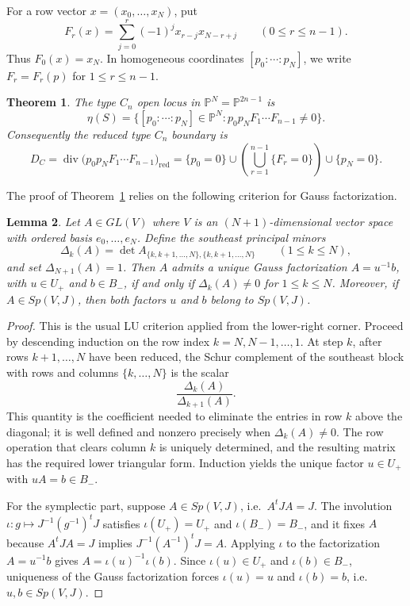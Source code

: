 \documentclass{article}
\newtheorem{thm}{Theorem}[section]
\newtheorem{lemma}[thm]{Lemma}
\newcommand{\PP}{\mathbb{P}}
\begin{document}
For a row vector \(x=(x_0,\ldots,x_N)\), put
\[
F_r(x)=\sum_{j=0}^r(-1)^jx_{r-j}x_{N-r+j}
\qquad(0\le r\le n-1).
\]
Thus \(F_0(x)=x_N\). In homogeneous coordinates \([p_0:\cdots:p_N]\), we write \(F_r=F_r(p)\) for \(1\le r\le n-1\).

\begin{thm}\label{thm:richardson-boundary}
The type \(C_n\) open locus in \(\PP^N=\PP^{2n-1}\) is
\[
\eta(S)=
\{[p_0:\cdots:p_N]\in \PP^N:
 p_0p_NF_1\cdots F_{n-1}\ne0\}.
\]
Consequently the reduced type \(C_n\) boundary is
\[
D_C
=
\operatorname{div}\bigl(p_0p_NF_1\cdots F_{n-1}\bigr)_{\mathrm{red}}
=
\{p_0=0\}
\cup
\left(\bigcup_{r=1}^{n-1}\{F_r=0\}\right)
\cup
\{p_N=0\}.
\]
\end{thm}

The proof of Theorem~\ref{thm:richardson-boundary} relies on the following criterion for Gauss factorization.
\begin{lemma}\label{lem:southeast-elimination}
Let \(A\in GL(V)\) where \(V\) is an \((N+1)\)-dimensional vector space with ordered basis \(e_0,\dots,e_N\).
Define the southeast principal minors
\[
\Delta_k(A)=
\det A_{\{k,k+1,\dots,N\},\{k,k+1,\dots,N\}}
\qquad(1\le k\le N),
\]
and set \(\Delta_{N+1}(A)=1\).
Then \(A\) admits a unique Gauss factorization \(A=u^{-1}b\), with \(u\in U_+\) and \(b\in B_-\), if and only if \(\Delta_k(A)\neq 0\) for \(1\le k\le N\).
Moreover, if \(A\in Sp(V,J)\), then both factors \(u\) and \(b\) belong to \(Sp(V,J)\).
\end{lemma}

\begin{proof}
This is the usual LU criterion applied from the lower-right corner.
Proceed by descending induction on the row index \(k=N,N-1,\dots,1\).
At step \(k\), after rows \(k+1,\dots,N\) have been reduced, the Schur complement of the southeast block with rows and columns \(\{k,\dots,N\}\) is the scalar
\[
\frac{\Delta_k(A)}{\Delta_{k+1}(A)}.
\]
This quantity is the coefficient needed to eliminate the entries in row \(k\) above the diagonal; it is well defined and nonzero precisely when \(\Delta_k(A)\neq 0\).
The row operation that clears column \(k\) is uniquely determined, and the resulting matrix has the required lower triangular form.
Induction yields the unique factor \(u\in U_+\) with \(uA=b\in B_-\).

For the symplectic part, suppose \(A\in Sp(V,J)\), i.e.\ \(A^tJA=J\).
The involution \(\iota\colon g\mapsto J^{-1}(g^{-1})^tJ\) satisfies \(\iota(U_+)=U_+\) and \(\iota(B_-)=B_-\), and it fixes \(A\) because \(A^tJA=J\) implies \(J^{-1}(A^{-1})^tJ=A\).
Applying \(\iota\) to the factorization \(A=u^{-1}b\) gives \(A=\iota(u)^{-1}\iota(b)\).
Since \(\iota(u)\in U_+\) and \(\iota(b)\in B_-\), uniqueness of the Gauss factorization forces \(\iota(u)=u\) and \(\iota(b)=b\), i.e.\ \(u,b\in Sp(V,J)\).
\end{proof}
\end{document}
